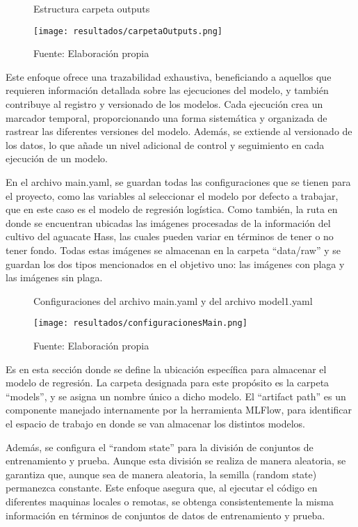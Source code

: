 \newpage

\begin{figure}[h]
\centering
\caption{Estructura carpeta outputs}
\texttt{[image: resultados/carpetaOutputs.png]}
\caption*{\footnotesize Fuente: Elaboración propia}
\label{fig:figuraEstructuraCarpetaOutputs}
\end{figure}

Este enfoque ofrece una trazabilidad exhaustiva, beneficiando a aquellos que requieren información detallada sobre las ejecuciones del modelo, y también contribuye al registro y versionado de los modelos. Cada ejecución crea un marcador temporal, proporcionando una forma sistemática y organizada de rastrear las diferentes versiones del modelo. Además, se extiende al versionado de los datos, lo que añade un nivel adicional de control y seguimiento en cada ejecución de un modelo. \newline

En el archivo main.yaml, se guardan todas las configuraciones que se tienen para el proyecto, como las variables al seleccionar el modelo por defecto a trabajar, que en este caso es el modelo de regresión logística. Como también, la ruta en donde se encuentran ubicadas las imágenes procesadas de la información del cultivo del aguacate Hass, las cuales pueden variar en términos de tener o no tener fondo. Todas estas imágenes se almacenan en la carpeta “data/raw” y se guardan los dos tipos mencionados en el objetivo uno: las imágenes con plaga y las imágenes sin plaga.

\newpage

\begin{figure}[h]
\centering
\caption{Configuraciones del archivo main.yaml y del archivo model1.yaml}
\texttt{[image: resultados/configuracionesMain.png]}
\caption*{\footnotesize Fuente: Elaboración propia}
\label{fig:figuraConfiguracionesMain}
\end{figure}

Es en esta sección donde se define la ubicación específica para almacenar el modelo de regresión. La carpeta designada para este propósito es la carpeta ``models'', y se asigna un nombre único a dicho modelo. El ``artifact path'' es un componente manejado internamente por la herramienta MLFlow, para identificar el espacio de trabajo en donde se van almacenar los distintos modelos. \newline

Además, se configura el ``random state'' para la división de conjuntos de entrenamiento y prueba. Aunque esta división se realiza de manera aleatoria, se garantiza que, aunque sea de manera aleatoria, la semilla (random state) permanezca constante. Este enfoque asegura que, al ejecutar el código en diferentes maquinas locales o remotas, se obtenga consistentemente la misma información en términos de conjuntos de datos de entrenamiento y prueba. \newline

